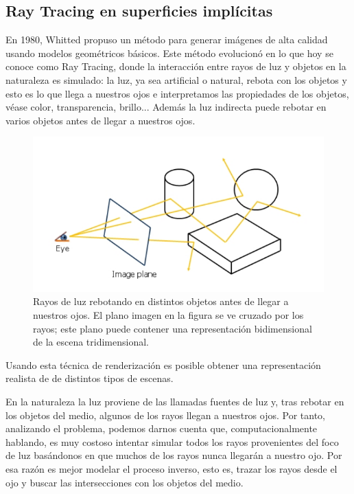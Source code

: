 \newpage
\subsection{Ray Tracing en superficies implícitas}

En 1980, Whitted\cite{Whitted80} propuso un método para generar imágenes de alta calidad usando modelos geométricos básicos. Este método evolucionó en lo que hoy se conoce como Ray Tracing, donde la interacción entre rayos de luz y objetos en la naturaleza es simulado: la luz, ya sea artificial o natural, rebota con los objetos y esto es lo que llega a nuestros ojos e interpretamos las propiedades de los objetos, véase color, transparencia, brillo... Además la luz indirecta puede rebotar en varios objetos antes de llegar a nuestros ojos.

\begin{figure}[h]
\centering
\includegraphics[scale=0.5]{images/florez1.png}
\caption{Rayos de luz rebotando en distintos objetos antes de llegar a nuestros ojos. El plano imagen en la figura se ve cruzado por los rayos; este plano puede contener una representación bidimensional de la escena tridimensional.}
\end{figure}

Usando esta técnica de renderización es posible obtener una representación realista de  de distintos tipos de escenas.
\par En la naturaleza la luz proviene de las llamadas fuentes de luz y, tras rebotar en los objetos del medio, algunos de los rayos llegan a nuestros ojos. Por tanto, analizando el problema, podemos darnos cuenta que, computacionalmente hablando, es muy costoso intentar simular todos los rayos provenientes del foco de luz basándonos en que muchos de los rayos nunca llegarán a nuestro ojo. Por esa razón  es mejor modelar el proceso inverso, esto es, trazar los rayos desde el ojo y buscar las intersecciones con  los objetos del medio.


